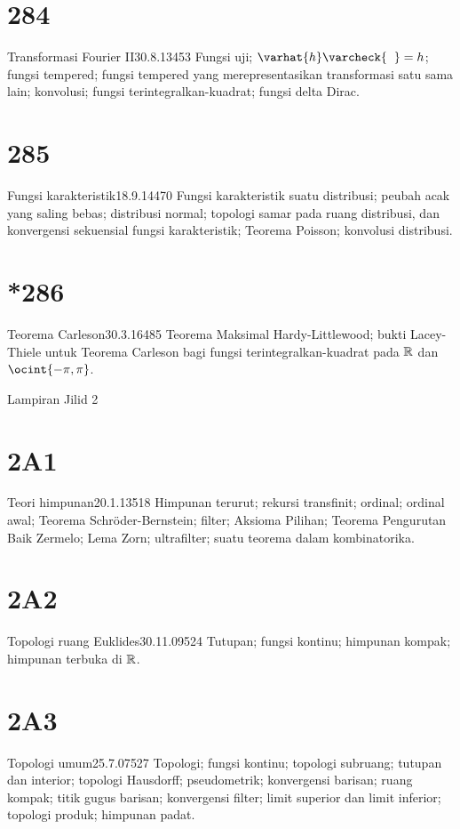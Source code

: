 \section{284}{Transformasi Fourier II}{30.8.13}{453}{}
{Fungsi uji; $\varhat{h}\varcheck{\phantom{h}}=h$; fungsi
tempered; fungsi tempered yang merepresentasikan transformasi satu sama lain;
konvolusi; fungsi terintegralkan-kuadrat; fungsi delta Dirac.}

\section{285}{Fungsi karakteristik}{18.9.14}{470}{}
{Fungsi karakteristik suatu distribusi; peubah acak yang saling
bebas; distribusi normal; topologi samar pada ruang
distribusi, dan konvergensi sekuensial fungsi karakteristik;
Teorema Poisson; konvolusi distribusi.}

\section{*286}{Teorema Carleson}{30.3.16}{485}{}
{Teorema Maksimal Hardy-Littlewood; bukti Lacey-Thiele untuk
Teorema Carleson bagi fungsi terintegralkan-kuadrat pada $\Bbb{R}$ dan
$\ocint{-\pi,\pi}$.}


 Lampiran Jilid 2


\section{2A1}{Teori himpunan}{20.1.13}{518}{}
{Himpunan terurut; rekursi transfinit; ordinal; ordinal awal;
Teorema Schr\"oder-\vthsp{}Bernstein; filter; Aksioma Pilihan;
Teorema Pengurutan Baik Zermelo; Lema Zorn; ultrafilter; suatu teorema
dalam kombinatorika.}

\section{2A2}{Topologi ruang Euklides}{30.11.09}{524}{}
{Tutupan; fungsi kontinu; himpunan kompak; himpunan terbuka di $\Bbb{R}$.}

\section{2A3}{Topologi umum}{25.7.07}{527}{}
{Topologi; fungsi kontinu; topologi subruang;
tutupan dan interior;
topologi Hausdorff; pseudometrik; konvergensi barisan;
ruang kompak; titik gugus barisan; konvergensi filter;
limit superior dan limit inferior; topologi produk; himpunan padat.}

